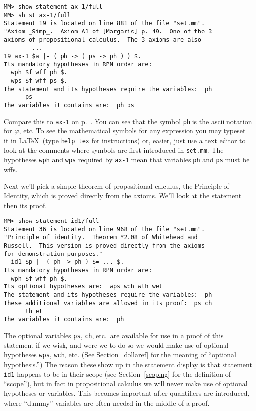 \begin{verbatim}
MM> show statement ax-1/full
MM> sh st ax-1/full
Statement 19 is located on line 881 of the file "set.mm".
"Axiom _Simp_.  Axiom A1 of [Margaris] p. 49.  One of the 3
axioms of propositional calculus.  The 3 axioms are also
        ...
19 ax-1 $a |- ( ph -> ( ps -> ph ) ) $.
Its mandatory hypotheses in RPN order are:
  wph $f wff ph $.
  wps $f wff ps $.
The statement and its hypotheses require the variables:  ph
      ps
The variables it contains are:  ph ps
\end{verbatim}

Compare this to \texttt{ax-1} on p.~\pageref{ax1}.  You can see that the
symbol \texttt{ph} is the {\sc ascii} notation for $\varphi$, etc.  To
see the mathematical symbols for any expression you may typeset it in
\LaTeX\ (type \texttt{help tex} for instructions)
or, easier, just use a text editor to look at the comments where symbols
are first introduced in \texttt{set.mm}.  The hypotheses \texttt{wph}
and \texttt{wps} required by \texttt{ax-1} mean that variables
\texttt{ph} and \texttt{ps} must be wffs.

Next we'll pick a simple theorem of propositional calculus, the Principle of
Identity, which is proved directly from the axioms.  We'll look at the
statement then its proof.

\begin{verbatim}
MM> show statement id1/full
Statement 36 is located on line 968 of the file "set.mm".
"Principle of identity.  Theorem *2.08 of Whitehead and
Russell.  This version is proved directly from the axioms
for demonstration purposes."
  id1 $p |- ( ph -> ph ) $= ... $.
Its mandatory hypotheses in RPN order are:
  wph $f wff ph $.
Its optional hypotheses are:  wps wch wth wet
The statement and its hypotheses require the variables:  ph
These additional variables are allowed in its proof:  ps ch
      th et
The variables it contains are:  ph
\end{verbatim}

The optional variables \texttt{ps}, \texttt{ch}, etc.\ are
available for use in a proof of this statement if we wish, and were we to do
so we would make use of optional hypotheses \texttt{wps}, \texttt{wch}, etc.  (See
Section~\ref{dollaref} for the meaning of ``optional
hypothesis.'') The reason these show up in the
statement display is that statement \texttt{id1} happens to be in their scope
(see Section~\ref{scoping} for the definition of ``scope''), but
in fact in propositional calculus we will never make use of optional
hypotheses or variables.  This becomes important after quantifiers are
introduced, where ``dummy'' variables are often needed
in the middle of a proof.

